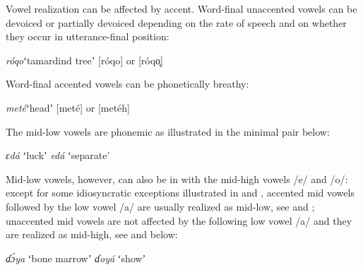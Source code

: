 \documentclass[output=paper,modfonts,nonflat,hidelinks]{langsci/langscibook}
\begin{document}
Vowel realization can be affected by accent. Word-final unaccented vowels can be devoiced or partially devoiced depending on the rate of speech and on whether they occur in utterance-final position:

\begin{exe}
	\ex \textit{róqo}\hspace{21mm}ʻtamardind treeʼ\hspace{6mm} [róqo] or [róqo̥] 
\end{exe}
Word-final accented vowels can be phonetically breathy:

\begin{exe}
	\ex \textit{meté}\hspace{21mm}ʻheadʼ\hspace{21mm} [meté] or [meté\super h]
\end{exe}
The mid-low vowels are phonemic as illustrated in the minimal pair below:

\begin{exe}
 \ex \begin{xlist}
	\ex \textit{ɛdá}\hspace{13mm} ʻluckʼ 	\label{ex:Petrollino:ɛdá1}	  		  
    \ex \textit{edá}\hspace{13mm} ʻseparate' \label{ex:Petrollino:edá}
\end{xlist}
\end{exe}
Mid-low vowels, however, can also be in  with the mid-high vowels /e/ and /o/: except for some idiosyncratic exceptions illustrated in  and , accented mid vowels followed by the low vowel /a/ are usually realized as mid-low, see  and ; unaccented mid vowels are not affected by the following low vowel /a/ and they are realized as mid-high, see  and  below:

\begin{exe}
	\ex \begin{xlist}
	\ex \textit{ɗɔ́ya}\hspace{10mm} ʻbone marrowʼ \label{ex:Petrollino:bone marrow}
    \ex \textit{ɗoyá}\hspace{10mm} ʻshowʼ \label{ex:Petrollino:show}
    \end{xlist}
\end{exe}
\end{document}
